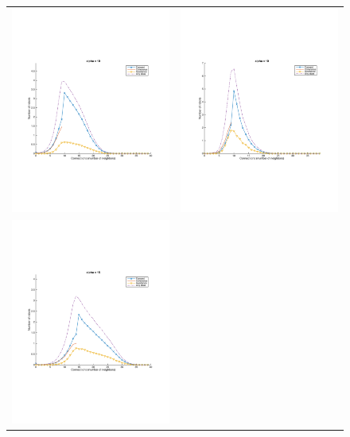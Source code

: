 \documentclass[a4paper, 10pt, conference]{ieeeconf}
\begin{document}
\begin{figure}[p]
\begin{center}
\begin{tabular}{lr}
        \includegraphics[width=8cm]{figures/simulation-40-alpha-10.pdf}  &
        \includegraphics[width=8cm]{figures/macroscopic-40-alpha-10.pdf} \\
        \includegraphics[width=8cm]{figures/simulation-40-alpha-15.pdf}  &

\end{tabular}
\end{center}
\end{figure}
\end{document}
